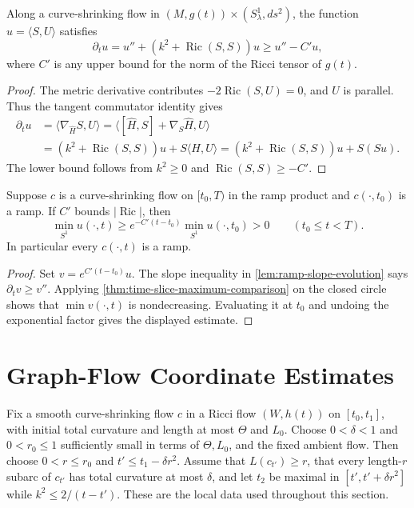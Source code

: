 \begin{theorem}
\label{lem:ramp-slope-evolution}
\notready
Along a curve-shrinking flow in
$(M,g(t))\times(S^1_\lambda,ds^2)$, the function
$u=\langle S,U\rangle$ satisfies
\[
 \partial_tu=u''+(k^2+\operatorname{Ric}(S,S))u
 \ge u''-C'u,
\]
where $C'$ is any upper bound for the norm of the Ricci tensor of $g(t)$.
\end{theorem}
\begin{proof}
The metric derivative contributes $-2\operatorname{Ric}(S,U)=0$, and $U$ is
parallel.  Thus the tangent commutator identity gives
\begin{align*}
 \partial_tu
 &=\langle\nabla_{\widehat H}S,U\rangle
 =\langle[\widehat H,S]+\nabla_S\widehat H,U\rangle\\
 &=(k^2+\operatorname{Ric}(S,S))u
   +S\langle H,U\rangle
 =(k^2+\operatorname{Ric}(S,S))u+S(Su).
\end{align*}
The lower bound follows from $k^2\ge0$ and
$\operatorname{Ric}(S,S)\ge-C'$.
\end{proof}

\begin{theorem}
\label{thm:ramp-preservation}
\notready
Suppose $c$ is a curve-shrinking flow on $[t_0,T)$ in the ramp product and
$c(\cdot,t_0)$ is a ramp.  If $C'$ bounds $|\operatorname{Ric}|$, then
\[
 \min_{S^1}u(\cdot,t)\ge
 e^{-C'(t-t_0)}\min_{S^1}u(\cdot,t_0)>0
 \qquad(t_0\le t<T).
\]
In particular every $c(\cdot,t)$ is a ramp.
\end{theorem}
\begin{proof}
Set $v=e^{C'(t-t_0)}u$.  The slope inequality in
\ref{lem:ramp-slope-evolution} says $\partial_tv\ge v''$.
Applying \ref{thm:time-slice-maximum-comparison} on the closed circle shows
that $\min v(\cdot,t)$ is nondecreasing.  Evaluating it at $t_0$ and undoing
the exponential factor gives the displayed estimate.
\end{proof}

\section{Graph-Flow Coordinate Estimates}

Fix a smooth curve-shrinking flow $c$ in a Ricci flow $(W,h(t))$ on
$[t_0,t_1]$, with initial total curvature and length at most $\Theta$ and
$L_0$.  Choose $0<\delta<1$ and $0<r_0\le1$ sufficiently small in terms of
$\Theta,L_0$, and the fixed ambient flow.  Then choose $0<r\le r_0$ and
$t'\le t_1-\delta r^2$.  Assume that $L(c_{t'})\ge r$, that every
length-$r$ subarc of $c_{t'}$ has total curvature at most $\delta$, and let
$t_2$ be maximal in $[t',t'+\delta r^2]$ while
$k^2\le2/(t-t')$.  These are the local data used throughout this section.

